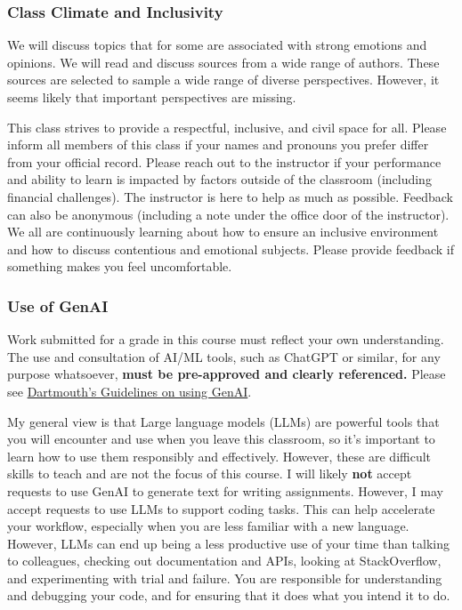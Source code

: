 \documentclass[
  11pt,
]{article}
\begin{document}
\subsubsection{Class Climate and
Inclusivity}\label{class-climate-and-inclusivity}

We will discuss topics that for some are associated with strong emotions
and opinions. We will read and discuss sources from a wide range of
authors. These sources are selected to sample a wide range of diverse
perspectives. However, it seems likely that important perspectives are
missing.

This class strives to provide a respectful, inclusive, and civil space
for all. Please inform all members of this class if your names and
pronouns you prefer differ from your official record. Please reach out
to the instructor if your performance and ability to learn is impacted
by factors outside of the classroom (including financial challenges).
The instructor is here to help as much as possible. Feedback can also be
anonymous (including a note under the office door of the instructor). We
all are continuously learning about how to ensure an inclusive
environment and how to discuss contentious and emotional subjects.
Please provide feedback if something makes you feel uncomfortable.

\subsubsection{Use of GenAI}\label{use-of-genai}

Work submitted for a grade in this course must reflect your own
understanding. The use and consultation of AI/ML tools, such as ChatGPT
or similar, for any purpose whatsoever, \textbf{must be pre-approved and
clearly referenced.} Please see
\href{https://policies.dartmouth.edu/policy/guidelines-using-generative-artificial-intelligence-genai-coursework}{Dartmouth's
Guidelines on using GenAI}.

My general view is that Large language models (LLMs) are powerful tools
that you will encounter and use when you leave this classroom, so it's
important to learn how to use them responsibly and effectively. However,
these are difficult skills to teach and are not the focus of this
course. I will likely \textbf{not} accept requests to use GenAI to
generate text for writing assignments. However, I may accept requests to
use LLMs to support coding tasks. This can help accelerate your
workflow, especially when you are less familiar with a new language.
However, LLMs can end up being a less productive use of your time than
talking to colleagues, checking out documentation and APIs, looking at
StackOverflow, and experimenting with trial and failure. You are
responsible for understanding and debugging your code, and for ensuring
that it does what you intend it to do.
\end{document}
